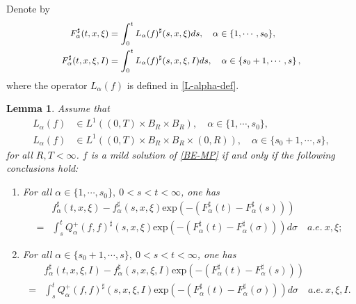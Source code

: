 \documentclass[reqno,11pt]{amsart}
\newtheorem{lemma}{Lemma}[section]
\numberwithin{equation}{section}
\def\exp{\mathrm{exp}}
\begin{document}
Denote by
\begin{equation}\label{F-sharp}{\small
\begin{aligned}
F^\sharp_\alpha (t,x,\xi)&= \int_{0}^{t} L_\alpha (f)^\sharp(s ,x,\xi )ds,\quad \alpha \in \{1,\cdots,s_0\},\\
F^\sharp_\alpha (t,x,\xi ,I)&= \int_{0}^{t} L_\alpha (f)^\sharp(s ,x,\xi,I)ds,\quad \alpha \in \{s_0+1,\cdots,s\} \,,
\end{aligned}}
\end{equation}
where the operator $L_\alpha (f)$ is defined in \eqref{L-alpha-def}.


\begin{lemma}\label{Lemma3.3}
	Assume that 
	\begin{equation*}
	\begin{aligned}
	L_\alpha (f)&\in L^1((0,T)\times B_R \times B_R ),\quad \alpha \in \{1,\cdots,s_0\},\\
	L_\alpha (f)&\in L^1((0,T)\times B_R \times B_R \times (0,R)), \quad \alpha \in \{s_0+1,\cdots,s\},
	\end{aligned}
	\end{equation*}
	for all $R,T<\infty$. $f$ is a mild solution of \eqref{BE-MP} if and only if the following conclusions hold:
	\begin{enumerate}
	\item {For all $\alpha \in \{1,\cdots,s_0\},\ 0<s<t<\infty$, one has
	\begin{equation}\label{3.5}
	\begin{aligned}
	&f^\sharp_\alpha (t,x,\xi) -f^\sharp_\alpha (s,x,\xi ) \exp(-(F^\sharp _{\alpha} (t)-F^\sharp _{\alpha} (s)))\\
	=&\int_{s}^{t} Q^+_{\alpha } (f,f) ^\sharp (s,x,\xi ) \exp(-(F^\sharp _{\alpha } (t)- F^\sharp _{\alpha } (\sigma))) d\sigma \quad  a.e.\ x,\xi;
	\end{aligned}
	\end{equation}	}		
	\item {For all $\alpha \in \{s_0+1,\cdots,s\},\ 0<s<t<\infty$, one has
	\begin{equation}\label{3.6}
	\begin{aligned}
	&f^\sharp_\alpha (t,x,\xi,I) -f^\sharp_\alpha (s,x,\xi ,I) \exp(-(F^\sharp _{\alpha} (t)-F^\sharp _{\alpha} (s)))\\
	=&\int_{s}^{t} Q^+_{\alpha } (f,f) ^\sharp (s,x,\xi ,I) \exp(-(F^\sharp _{\alpha } (t)- F^\sharp _{\alpha } (\sigma))) d\sigma \quad  a.e.\ x,\xi,I.
	\end{aligned}
	\end{equation}	}		
	\end{enumerate}
\end{lemma}
\end{document}
